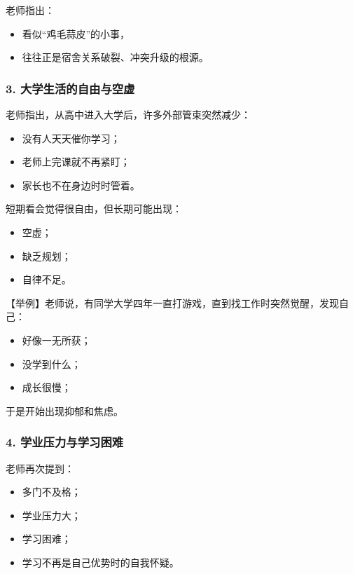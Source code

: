 \documentclass[
  chinese,
  9pt,
  a4paper,
]{ctexart}
\providecommand{\tightlist}{%
  \setlength{\itemsep}{0pt}\setlength{\parskip}{0pt}}
\begin{document}
老师指出：

\begin{itemize}
\tightlist
\item
  看似``鸡毛蒜皮''的小事，
\item
  往往正是宿舍关系破裂、冲突升级的根源。
\end{itemize}

\subsubsection{3.
大学生活的自由与空虚}\label{ux5927ux5b66ux751fux6d3bux7684ux81eaux7531ux4e0eux7a7aux865a}

老师指出，从高中进入大学后，许多外部管束突然减少：

\begin{itemize}
\tightlist
\item
  没有人天天催你学习；
\item
  老师上完课就不再紧盯；
\item
  家长也不在身边时时管着。
\end{itemize}

短期看会觉得很自由，但长期可能出现：

\begin{itemize}
\tightlist
\item
  空虚；
\item
  缺乏规划；
\item
  自律不足。
\end{itemize}

【举例】老师说，有同学大学四年一直打游戏，直到找工作时突然觉醒，发现自己：

\begin{itemize}
\tightlist
\item
  好像一无所获；
\item
  没学到什么；
\item
  成长很慢；
\end{itemize}

于是开始出现抑郁和焦虑。

\subsubsection{4.
学业压力与学习困难}\label{ux5b66ux4e1aux538bux529bux4e0eux5b66ux4e60ux56f0ux96be}

老师再次提到：

\begin{itemize}
\tightlist
\item
  多门不及格；
\item
  学业压力大；
\item
  学习困难；
\item
  学习不再是自己优势时的自我怀疑。
\end{itemize}
\end{document}
